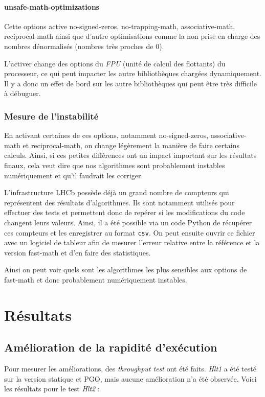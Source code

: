 \documentclass[a4paper]{report}
\begin{document}
\subsubsection{unsafe-math-optimizations}
Cette options active no-signed-zeros, no-trapping-math, associative-math, reciprocal-math ainsi que d'autre optimisations comme la non prise en charge des nombres dénormalisés (nombres très proches de $0$).

L'activer change des options du \emph{FPU} (unité de calcul des flottants) du processeur, ce qui peut impacter les autre bibliothèques chargées dynamiquement.
Il y a donc un effet de bord sur les autre bibliothèques qui peut être très difficile à débuguer.

\subsection{Mesure de l'instabilité}
En activant certaines de ces options, notamment no-signed-zeros, associative-math et reciprocal-math, on change légèrement la manière de faire certains calculs.
Ainsi, si ces petites différences ont un impact important sur les résultats finaux, cela veut dire que nos algorithmes sont probablement instables numériquement et qu'il faudrait les corriger.

L'infrastructure LHCb possède déjà un grand nombre de compteurs qui représentent des résultats d'algorithmes.
Ils sont notamment utilisés pour effectuer des tests et permettent donc de repérer si les modifications du code changent leurs valeurs.
Ainsi, il a été possible via un code Python de récupérer ces compteurs et les enregistrer au format \verb'csv'.
On peut ensuite ouvrir ce fichier avec un logiciel de tableur afin de mesurer l'erreur relative entre la référence et la version fast-math et d'en faire des statistiques.

Ainsi on peut voir quels sont les algorithmes les plus sensibles aux options de fast-math et donc probablement numériquement instables.


\chapter{Résultats}

\section{Amélioration de la rapidité d'exécution}
Pour mesurer les améliorations, des \emph{throughput test} ont été faits.
\emph{Hlt1} a été testé sur la version statique et PGO, mais aucune amélioration n'a été observée.
Voici les résultats pour le test \emph{Hlt2} :
\end{document}
